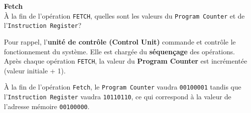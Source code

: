 \begin{Exercice}[5 minutes]\textbf{Fetch}\\
    À la fin de l'opération \lstinline{FETCH}, quelles sont les valeurs du \lstinline{Program Counter} et de l'\lstinline{Instruction Register}?

    \begin{conseil}
        Pour rappel, l'\textbf{unité de contrôle (Control Unit)} commande et contrôle le fonctionnement du système. Elle est chargée du \textbf{séquençage} des opérations. Après chaque opération \lstinline{FETCH}, la valeur du \textbf{Program Counter} est incrémentée (valeur initiale + 1).
    \end{conseil}

    \begin{solution}
        À la fin de l'opération \lstinline{Fetch}, le \lstinline{Program Counter} vaudra \lstinline{00100001} tandis que l'\lstinline{Instruction Register} vaudra \lstinline{10110110}, ce qui correspond à la valeur de l'adresse mémoire \lstinline{00100000}.
    \end{solution}
\end{Exercice}

